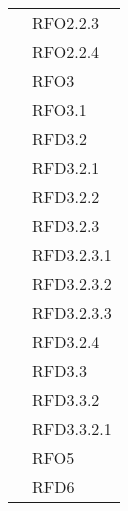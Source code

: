 \begin{longtable}{|>{\centering}m{10cm}|m{3cm}<{\centering}|}
& RFO2.2.3\\
& RFO2.2.4\\
& RFO3\\
& RFO3.1\\
& RFD3.2\\
& RFD3.2.1\\
& RFD3.2.2\\
& RFD3.2.3\\
& RFD3.2.3.1\\
& RFD3.2.3.2\\
& RFD3.2.3.3\\
& RFD3.2.4\\
& RFD3.3\\
& RFD3.3.2\\
& RFD3.3.2.1\\
& RFO5\\
& RFD6\\ \hline


\end{longtable}
